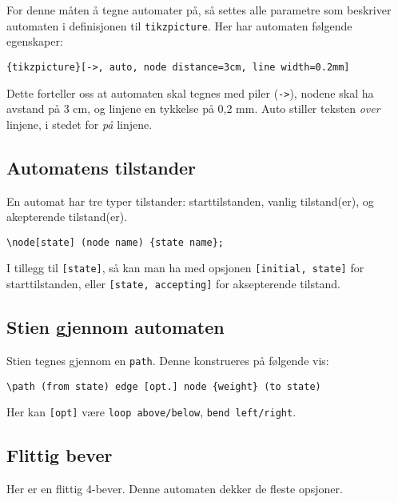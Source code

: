 \documentclass[11pt, a4paper]{article}
\begin{document}
For denne måten å tegne automater på, så settes alle parametre som beskriver automaten i definisjonen til \texttt{tikzpicture}. 
Her har automaten følgende egenskaper:
\begin{center}
\texttt{\{tikzpicture\}[->, auto, node distance=3cm, line width=0.2mm]}
\end{center}
Dette forteller oss at automaten skal tegnes med piler (\texttt{->}), nodene skal ha avstand på 3 cm, og linjene en tykkelse på 0,2 mm. Auto stiller teksten \textit{over} linjene, i stedet for \textit{på} linjene.

\subsection{Automatens tilstander} En automat har tre typer tilstander: starttilstanden, vanlig tilstand(er), og akepterende tilstand(er).

\begin{Verbatim}[fontsize=\small]
\node[state] (node name) {state name};
\end{Verbatim}

I tillegg til \texttt{[state]}, så kan man ha med opsjonen \texttt{[initial, state]} for starttilstanden, eller \texttt{[state, accepting]} for aksepterende tilstand.

\subsection{Stien gjennom automaten}
Stien tegnes gjennom en \texttt{path}. Denne konstrueres på følgende vis:

\begin{Verbatim}[fontsize=\small]
\path (from state) edge [opt.] node {weight} (to state)
\end{Verbatim}

\noindent Her kan \texttt{[opt]} være \texttt{loop above/below}, \texttt{bend left/right}.

\subsection*{Flittig bever}
Her er en flittig 4-bever. Denne automaten dekker de fleste opsjoner.
\begin{center}
\end{center}
\end{document}
